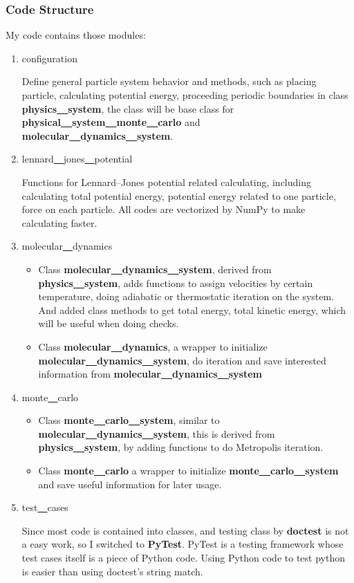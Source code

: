\documentclass[UTF8,a4paper]{article}
\begin{document}
\subsubsection{Code Structure}
My code contains those modules:
\begin{enumerate}
	\item configuration

	      Define general particle system behavior and methods, such as placing particle, calculating potential energy, proceeding periodic boundaries in class \textbf{physics\underline{~~}system}, the class will be base class for
	      \textbf{physical\underline{~~}system\underline{~~}monte\underline{~~}carlo} and \textbf{molecular\underline{~~}dynamics\underline{~~}system}.
	\item lennard\underline{~~}jones\underline{~~}potential

	      Functions for Lennard–Jones potential related calculating, including calculating total potential energy, potential energy related to one particle, force on each particle. All codes are vectorized by NumPy to make calculating
	      faster.
	\item molecular\underline{~~}dynamics

	      \begin{itemize}
		      \item Class \textbf{molecular\underline{~~}dynamics\underline{~~}system}, derived from \textbf{physics\underline{~~}system}, adds functions to assign velocities by certain temperature, doing adiabatic or thermostatic iteration
		            on the system. And added class methods to get total energy, total kinetic energy, which will be useful when doing checks.
		      \item Class \textbf{molecular\underline{~~}dynamics}, a wrapper to initialize \textbf{molecular\underline{~~}dynamics\underline{~~}system}, do iteration and save interested information from \textbf{molecular\underline{~~}dynamics\underline{~~}system}
	      \end{itemize}
	\item monte\underline{~~}carlo

	      \begin{itemize}
		      \item Class \textbf{monte\underline{~~}carlo\underline{~~}system}, similar to \textbf{molecular\underline{~~}dynamics\underline{~~}system}, this is derived from \textbf{physics\underline{~~}system}, by adding functions to do Metropolis
		            iteration.
		      \item Class \textbf{monte\underline{~~}carlo} a wrapper to initialize \textbf{monte\underline{~~}carlo\underline{~~}system} and save useful information for later usage.
	      \end{itemize}
	\item test\underline{~~}cases

	      Since most code is contained into classes, and testing class by \textbf{doctest} is not a easy work, so I switched to \textbf{PyTest}. PyTest is a testing framework whose test cases itself is a piece of Python code. Using Python code to test python is
	      easier than using doctest's string match.
\end{enumerate}
\end{document}
